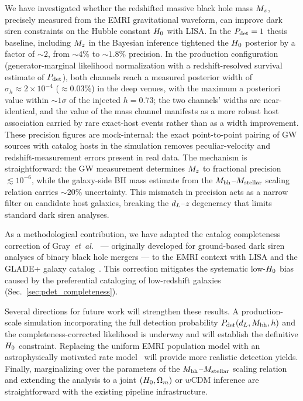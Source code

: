 
We have investigated whether the redshifted massive black hole mass
$M_z$, precisely measured from the EMRI gravitational waveform, can
improve dark siren constraints on the Hubble constant $H_0$ with LISA.
In the $P_\mathrm{det} = 1$ thesis baseline, including $M_z$ in the Bayesian
inference tightened the $H_0$ posterior by a factor of $\sim 2$, from
$\sim 4\%$ to $\sim 1.8\%$ precision.  In the production configuration
(generator-marginal likelihood normalization with a redshift-resolved
survival estimate of $P_\mathrm{det}$), both channels reach a measured posterior
width of $\sigma_h \approx 2\times10^{-4}$ ($\approx 0.03\%$) in the
deep venues, with the maximum a posteriori value within $\sim 1\sigma$
of the injected $h = 0.73$; the two channels' widths are
near-identical, and the value of the mass channel manifests as a more
robust host association carried by rare exact-host events rather than
as a width improvement.  These precision figures are mock-internal:
the exact point-to-point pairing of GW sources with catalog hosts in
the simulation removes peculiar-velocity and redshift-measurement
errors present in real data.
The mechanism is
straightforward: the GW measurement determines $M_z$ to fractional
precision $\lesssim 10^{-6}$, while the galaxy-side BH mass estimate
from the $M_\mathrm{bh}$--$M_\mathrm{stellar}$ scaling relation carries $\sim 20\%$
uncertainty.  This mismatch in precision acts as a narrow filter on
candidate host galaxies, breaking the $d_L$--$z$ degeneracy that
limits standard dark siren analyses.

As a methodological contribution, we have adapted the catalog
completeness correction of
Gray~\emph{et~al.}~\cite{Gray:2019ksv} --- originally developed for
ground-based dark siren analyses of binary black hole mergers --- to
the EMRI context with LISA and the GLADE+ galaxy
catalog~\cite{Dalya:2021ewn}.  This correction mitigates the
systematic low-$H_0$ bias caused by the preferential cataloging of
low-redshift galaxies (Sec.~\ref{sec:pdet_completeness}).

Several directions for future work will strengthen these results.
A production-scale simulation incorporating the full detection
probability $P_\mathrm{det}(d_L, M_\mathrm{bh}, h)$ and the completeness-corrected
likelihood is underway and will establish the definitive $H_0$
constraint.  Replacing the uniform EMRI population model with an
astrophysically motivated rate model~\cite{Babak:2017tow} will
provide more realistic detection yields.  Finally, marginalizing over
the parameters of the $M_\mathrm{bh}$--$M_\mathrm{stellar}$ scaling
relation~\cite{Reines:2015moa} and extending the analysis to a joint
$(H_0, \Omega_m)$ or $w$CDM inference are straightforward with the
existing pipeline infrastructure.
